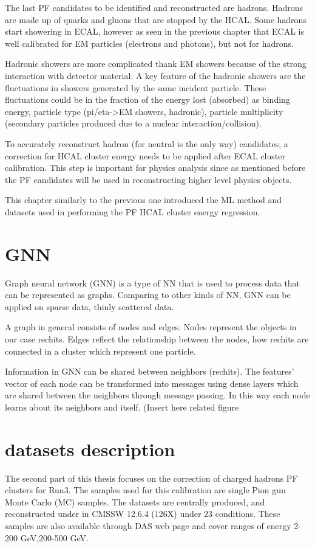 The last PF candidates to be identified and reconstructed are hadrons. Hadrons are made up of quarks and gluons that are stopped by the HCAL. Some hadrons start showering in ECAL, however as seen in the previous chapter that ECAL is well calibrated for EM particles (electrons and photons), but not for hadrons.

Hadronic showers are more complicated thank EM showers because of the strong interaction with detector material. A key feature of the hadronic showers are the fluctuations in showers generated by the same incident particle. These fluctuations could be in the fraction of the energy lost (absorbed) as binding energy, particle type (pi/eta->EM showers, hadronic), particle multiplicity (secondary particles produced due to a nuclear interaction/collision). %

To accurately reconstruct hadron (for neutral is the only way) candidates, a correction for HCAL cluster energy needs to be applied after ECAL cluster calibration. This step is important for physics analysis since as mentioned before the PF candidates will be used in reconstructing higher level physics objects.

This chapter similarly to the previous one introduced the ML method and datasets used in performing the PF HCAL cluster energy regression.

\section{GNN} %
Graph neural network (GNN) is a type of NN that is used to process data that can be represented as graphs. Comparing to other kinds of NN, GNN can be applied on sparse data, thinly scattered data.

A graph in general consists of nodes and edges. Nodes represent the objects in our case rechits. Edges reflect the relationship between the nodes, how rechits are connected in a cluster which represent one particle.

Information in GNN can be shared between neighbors (rechits). The features’ vector of each node can be transformed into messages using dense layers which are shared between the neighbors through message passing. In this way each node learns about its neighbors and itself. (Insert here related figure %

\section{datasets description}
The second part of this thesis focuses on the correction of charged hadrons PF clusters for Run3. The samples used for this calibration are single Pion gun Monte Carlo (MC) samples. The datasets are centrally produced, and reconstructed under in CMSSW 12.6.4 (126X) under 23 conditions. These samples are also available through DAS web page and cover ranges of energy 2-200 GeV,200-500 GeV.

